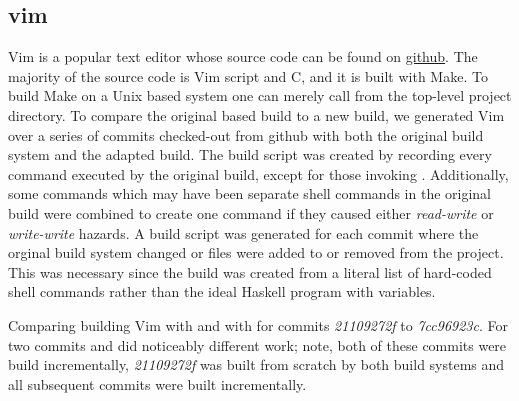 \subsection{vim}
\label{sec:eval:vim}

Vim is a popular text editor whose source code can be found on \href{https://github.com/vim/vim}{github}.  The majority of the source code is Vim script and C, and it is built with Make.  To build Make on a Unix based system one can merely call \Make from the top-level project directory.  To compare the original \Make based build to a new \Rattle build, we generated Vim over a series of commits checked-out from github with both the original build system and the adapted \Rattle build.  The \Rattle build script was created by recording every command executed by the original build, except for those invoking \Make.  Additionally, some commands which may have been separate shell commands in the original build were combined to create one command if they caused either \emph{read-write} or \emph{write-write} hazards.  A \Rattle build script was generated for each commit where the orginal build system changed or files were added to or removed from the project.  This was necessary since the \Rattle build was created from a literal list of hard-coded shell commands rather than the ideal Haskell program with variables.


Comparing building Vim \cite{} with \Make and with \Rattle for commits \emph{21109272f} to \emph{7cc96923c}.  For two commits \Make and \Rattle did noticeably different work; note, both of these commits were build incrementally, \emph{21109272f} was built from scratch by both build systems and all subsequent commits were built incrementally.

